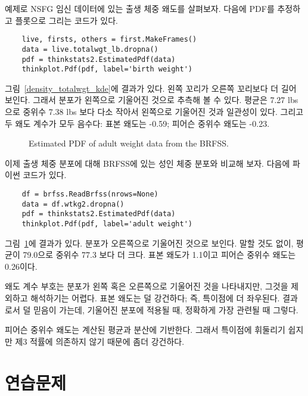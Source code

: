 예제로 NSFG 임신 데이터에 있는 출생 체중 왜도를 살펴보자.
다음에 PDF를 추정하고 플롯으로 그리는 코드가 있다.

\begin{verbatim}
    live, firsts, others = first.MakeFrames()
    data = live.totalwgt_lb.dropna()
    pdf = thinkstats2.EstimatedPdf(data)
    thinkplot.Pdf(pdf, label='birth weight')
\end{verbatim}

그림~\ref{density_totalwgt_kde}에 결과가 있다.
왼쪽 꼬리가 오른쪽 꼬리보다 더 길어 보인다. 
그래서 분포가 왼쪽으로 기울어진 것으로 추측해 볼 수 있다.
평균은 7.27 lbs 으로 중위수 7.38 lbs 보다 다소 작아서 왼쪽으로 기울어진 것과
일관성이 있다. 그리고 두 왜도 계수가 모두 음수다: 표본 왜도는  -0.59; 피어슨 중위수 왜도는 -0.23.

\begin{figure}
\caption{Estimated PDF of adult weight data from the BRFSS.}
\label{density_wtkg2_kde}
\end{figure}

이제 출생 체중 분포에 대해 BRFSS에 있는 성인 체중 분포와 비교해 보자.
다음에 파이썬 코드가 있다.

\begin{verbatim}
    df = brfss.ReadBrfss(nrows=None)
    data = df.wtkg2.dropna()
    pdf = thinkstats2.EstimatedPdf(data)
    thinkplot.Pdf(pdf, label='adult weight')
\end{verbatim}

그림~\ref{density_wtkg2_kde}에 결과가 있다.
분포가 오른쪽으로 기울어진 것으로 보인다.
말할 것도 없이, 평균이 79.0으로 중위수 77.3 보다 더 크다.
표본 왜도가 1.1이고 피어슨 중위수 왜도는 0.26이다.

왜도 계수 부호는 분포가 왼쪽 혹은 오른쪽으로 기울어진 것을 나타내지만,
그것을 제외하고 해석하기는 어렵다.
표본 왜도는 덜 강건하다; 즉, 특이점에 더 좌우된다.
결과로서 덜 믿음이 가는데, 기울어진 분포에 적용될 때, 정확하게 가장 관련될 때 그렇다. 


피어슨 중위수 왜도는 계산된 평균과 분산에 기반한다.
그래서 특이점에 휘둘리기 쉽지만 제3 적률에 의존하지 않기 때문에 좀더 강건하다.


\section{연습문제}

